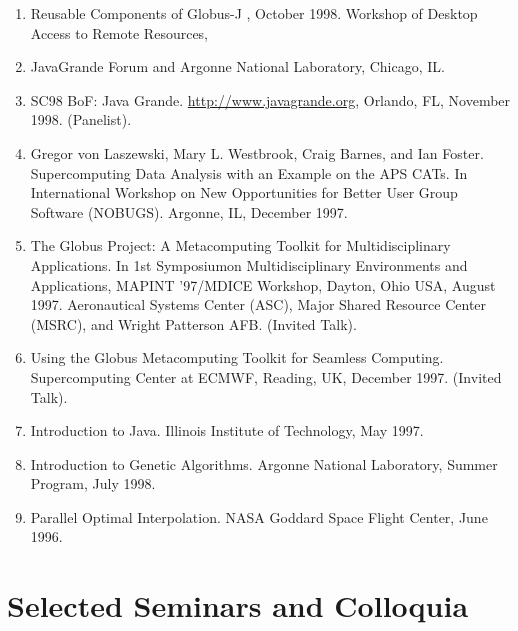 \documentclass{article}
\begin{document}
\begin{enumerate}
\item  Reusable Components of Globus-J , October 1998. Workshop of Desktop Access to Remote Resources,  
\item  JavaGrande Forum and Argonne National Laboratory, Chicago, IL.  
\item  SC98 BoF: Java Grande. \url{http://www.javagrande.org}, Orlando, FL, November 1998. (Panelist). 
\item  Gregor von Laszewski, Mary L. Westbrook, Craig Barnes, and Ian Foster. Supercomputing Data Analysis with an Example on the APS CATs. In International Workshop on New Opportunities for Better User Group Software (NOBUGS). Argonne, IL, December 1997.  
\item  The Globus Project: A Metacomputing Toolkit for Multidisciplinary Applications. In 1st Symposiumon Multidisciplinary Environments and Applications, MAPINT '97/MDICE Workshop, Dayton, Ohio USA, August 1997. Aeronautical Systems Center (ASC), Major Shared Resource Center (MSRC), and Wright Patterson AFB. (Invited Talk). 
\item  Using the Globus Metacomputing Toolkit for Seamless Computing. Supercomputing Center at ECMWF, Reading, UK, December 1997. (Invited Talk). 
\item  Introduction to Java. Illinois Institute of Technology, May 1997. 
\item  Introduction to Genetic Algorithms. Argonne National Laboratory, Summer Program, July 1998. 
\item  Parallel Optimal Interpolation. NASA Goddard Space Flight Center, June 1996. 
\end{enumerate}
 
\section{Selected Seminars and Colloquia}
\end{document}
